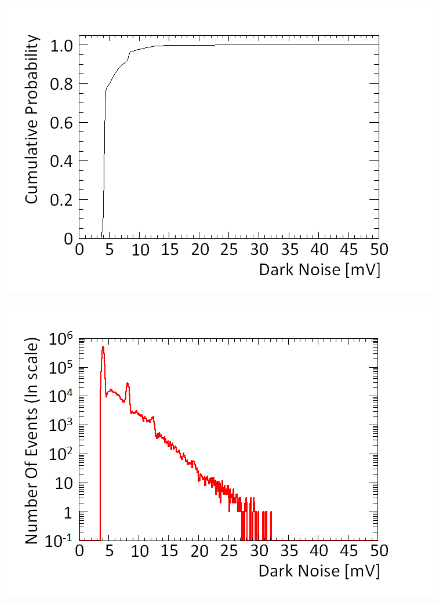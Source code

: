 
\begin{figure}[!h]
\centering
\begin{minipage}{.45\textwidth}
  \centering
  \includegraphics[width=\linewidth]{Chapter4/Figs/Raster/cumulative_prob_dark_noiseMedText.png}
  \label{fig:cumulative_prob_dark}
  \vspace{0.956cm} %
\end{minipage}%
\qquad
\begin{minipage}{.45\textwidth}
  \centering
  \includegraphics[width=\linewidth]{Chapter4/Figs/darkNoiseLogMedText.png} 

\end{minipage}
\end{figure}
